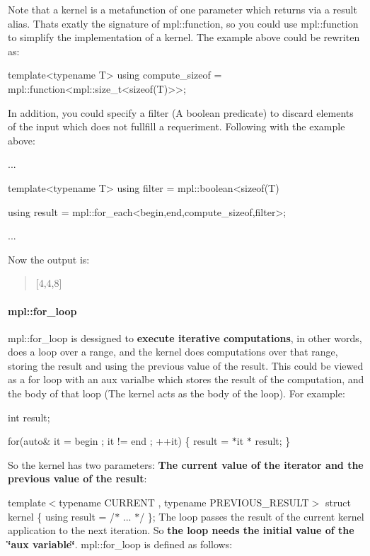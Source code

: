 Note that a kernel is a metafunction of one parameter which returns via a {\ttfamily result} alias. Thats exatly the signature of {\ttfamily mpl\+::function}, so you could use {\ttfamily mpl\+::function} to simplify the implementation of a kernel. The example above could be rewriten as\+: \begin{DoxyVerb}template<typename T>
using compute_sizeof = mpl::function<mpl::size_t<sizeof(T)>>;
\end{DoxyVerb}


In addition, you could specify a filter (A boolean predicate) to discard elements of the input which does not fullfill a requeriment. Following with the example above\+: \begin{DoxyVerb}...

template<typename T>
using filter = mpl::boolean<sizeof(T) %

using result = mpl::for_each<begin,end,compute_sizeof,filter>;

...
\end{DoxyVerb}
 Now the output is\+: \begin{quote}
\mbox{[}4,4,8\mbox{]} \end{quote}


\paragraph*{{\ttfamily mpl\+::for\+\_\+loop}}

{\ttfamily mpl\+::for\+\_\+loop} is dessigned to {\bfseries execute iterative computations}, in other words, does a loop over a range, and the kernel does computations over that range, storing the result and using the previous value of the result. This could be viewed as a for loop with an aux varialbe which stores the result of the computation, and the body of that loop (The kernel acts as the body of the loop). For example\+:

int result;

for(auto\& it = begin ; it != end ; ++it) \{ result = $\ast$it $\ast$ result; \}

So the kernel has two parameters\+: {\bfseries The current value of the iterator and the previous value of the result}\+:

template$<$typename C\+U\+R\+R\+E\+N\+T , typename P\+R\+E\+V\+I\+O\+U\+S\+\_\+\+R\+E\+S\+U\+L\+T$>$ struct kernel \{ using result = /$\ast$ ... $\ast$/ \}; The loop passes the {\ttfamily result} of the current kernel application to the next iteration. So {\bfseries the loop needs the initial value of the \char`\"{}aux variable\char`\"{}}. {\ttfamily mpl\+::for\+\_\+loop} is defined as follows\+:


